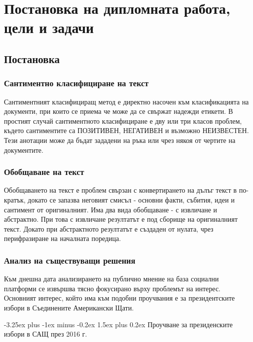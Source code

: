 \documentclass{article}
\makeatletter
\newcounter{subsubsubsection}[subsubsection]
\renewcommand\paragraph{\@startsection{paragraph}{5}{\z@}%
{3.25ex \@plus1ex \@minus.2ex}%
{-1em}%
{\normalfont\normalsize\bfseries}}
\renewcommand{\paragraph}{\@startsection{paragraph}{4}{0ex}%
{-3.25ex plus -1ex minus -0.2ex}%
{1.5ex plus 0.2ex}%
{\normalfont\normalsize\bfseries}}
\makeatother
\begin{document}
\newpage


\section{Постановка на дипломната работа, цели и задачи}

\subsection{Постановка}

\subsubsection{Сантиментно класифициране на текст}

Сантиментният класифициращ метод е директно насочен към класификацията на документи, при които се приема че може да се
свържат надежди етикети. В простият случай сантиментното класифициране е дву или три класов проблем, където сантиментите
са ПОЗИТИВЕН, НЕГАТИВЕН и възможно НЕИЗВЕСТЕН. Тези анотации може да бъдат зададени на ръка или чрез някоя от чертите на
документите. \cite{intro-to-nlp-mit}

\subsubsection{Обобщаване на текст}

Обобщаването на текст е проблем свързан с конвертирането на дълъг текст в по-кратък, докато се запазва неговият смисъл
- основни факти, събития, идеи и сантимент от оригиналният. Има два вида обобщаване - с извличане и абстрактно. При
това с извличане резултатът е под сборище на оригиналният текст. Докато при абстрактното резултатът е създаден от
нулата, чрез перифразиране на началната поредица. \cite{intro-to-nlp-mit}

\subsubsection{Анализ на съществуващи решения}


Към днешна дата анализирането на публично мнение на база социални платформи се извършва тясно фокусирано върху проблемът
на интерес. Основният интерес, който има към подобни проучвания е за президентските избори в Съединените Американски
Щати.

\paragraph{Проучване за президенските избори в САЩ през 2016 г.}
\end{document}
